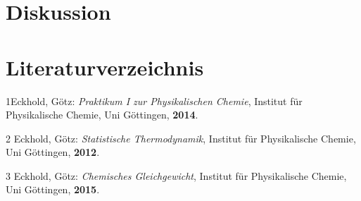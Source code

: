 \documentclass[12pt,a4paper,titlepage,headinclude,bibtotoc]{scrartcl}
\begin{document}
\section{Diskussion}
\newpage
\section{Literaturverzeichnis}
1\quad Eckhold, Götz: \emph{Praktikum I zur Physikalischen Chemie}, Institut für Physikalische Chemie, Uni Göttingen, \textbf{2014}.

\vspace{0,5 cm}
2 \quad Eckhold, Götz: \emph{Statistische Thermodynamik}, Institut für Physikalische Chemie, Uni Göttingen, \textbf{2012}.

\vspace{0,5cm}
3 \quad Eckhold, Götz: \emph{Chemisches Gleichgewicht}, Institut für Physikalische Chemie, Uni Göttingen, \textbf{2015}.\\
\end{document}
